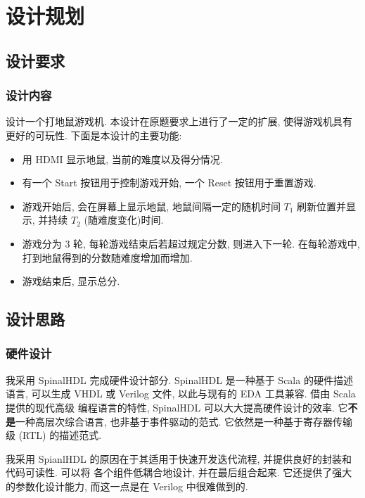 \section{设计规划}

\subsection{设计要求}

\subsubsection{设计内容}

设计一个打地鼠游戏机. 本设计在原题要求上进行了一定的扩展, 使得游戏机具有更好的可玩性. 下面是本设计的主要功能:

\begin{itemize}
    \item 用 HDMI 显示地鼠, 当前的难度以及得分情况.
    \item 有一个 Start 按钮用于控制游戏开始, 一个 Reset 按钮用于重置游戏.
    \item 游戏开始后, 会在屏幕上显示地鼠, 地鼠间隔一定的随机时间 $T_1$ 刷新位置并显示, 并持续 $T_2$ (随难度变化)时间. 
    \item 游戏分为 3 轮, 每轮游戏结束后若超过规定分数, 则进入下一轮. 在每轮游戏中, 打到地鼠得到的分数随难度增加而增加.
    \item 游戏结束后, 显示总分. 
\end{itemize}

\subsection{设计思路}

\subsubsection{硬件设计}

我采用 SpinalHDL 完成硬件设计部分. SpinalHDL 是一种基于 Scala 的硬件描述语言, 
可以生成 VHDL 或 Verilog 文件, 以此与现有的 EDA 工具兼容. 借由 Scala 提供的现代高级
编程语言的特性, SpinalHDL 可以大大提高硬件设计的效率. 它\textbf{不是}一种高层次综合语言, 
也非基于事件驱动的范式. 它依然是一种基于寄存器传输级 (RTL) 的描述范式. 

我采用 SpianlHDL 的原因在于其适用于快速开发迭代流程, 并提供良好的封装和代码可读性. 可以将
各个组件低耦合地设计, 并在最后组合起来. 它还提供了强大的参数化设计能力, 而这一点是在 Verilog
中很难做到的. 

